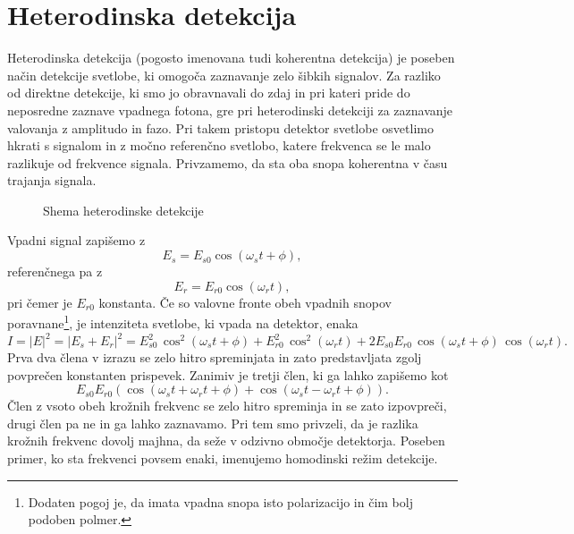 \section{Heterodinska detekcija}
Heterodinska detekcija (pogosto imenovana tudi koherentna detekcija) je poseben način
detekcije svetlobe, ki omogoča zaznavanje zelo šibkih signalov. Za razliko od direktne detekcije,
ki smo jo obravnavali do zdaj in pri kateri pride do neposredne zaznave vpadnega fotona, 
gre pri heterodinski detekciji za zaznavanje valovanja z amplitudo in fazo. Pri takem 
pristopu detektor svetlobe osvetlimo hkrati s signalom in z močno referenčno svetlobo, 
katere frekvenca se le malo razlikuje od frekvence signala. Privzamemo, da sta oba snopa 
koherentna v času trajanja signala.
\begin{figure}[h]
\centering
\def\svgwidth{80truemm} 

\caption{Shema heterodinske detekcije}
\label{11_Hetero}
\end{figure}

Vpadni signal zapišemo z
\begin{equation}
E_s = E_{s0} \cos(\omega_st+\phi),
\end{equation}
referenčnega pa z
\begin{equation}
E_r = E_{r0} \cos(\omega_rt),
\end{equation}
pri čemer je $E_{r0}$ konstanta. Če so valovne fronte obeh vpadnih snopov 
poravnane\footnote{Dodaten pogoj je, da imata vpadna snopa isto polarizacijo in čim bolj 
podoben polmer.}, je intenziteta svetlobe, 
ki vpada na detektor, enaka
\begin{equation}
I = |E|^2 = |E_s+E_r|^2 = E_{s0}^2 \, \cos^2(\omega_st+\phi)+
E_{r0}^2 \, \cos^2(\omega_rt) + 2E_{s0}E_{r0}\, \cos(\omega_st+\phi)\, \cos(\omega_rt).
\end{equation}
Prva dva člena v izrazu se zelo hitro spreminjata in zato predstavljata zgolj 
povprečen konstanten prispevek. 
Zanimiv je tretji člen, ki ga lahko zapišemo
kot
\begin{equation}
E_{s0}E_{r0}\left( \cos(\omega_st+\omega_rt+\phi)+\cos(\omega_st-\omega_rt+\phi)\right).
\end{equation}
Člen z vsoto obeh krožnih frekvenc se zelo hitro spreminja in se zato izpovpreči, 
drugi člen pa ne in ga lahko zaznavamo. 
Pri tem smo privzeli, da je razlika krožnih frekvenc dovolj majhna, da seže v odzivno območje
detektorja. Poseben primer, ko sta frekvenci povsem enaki, imenujemo homodinski režim 
detekcije. 

